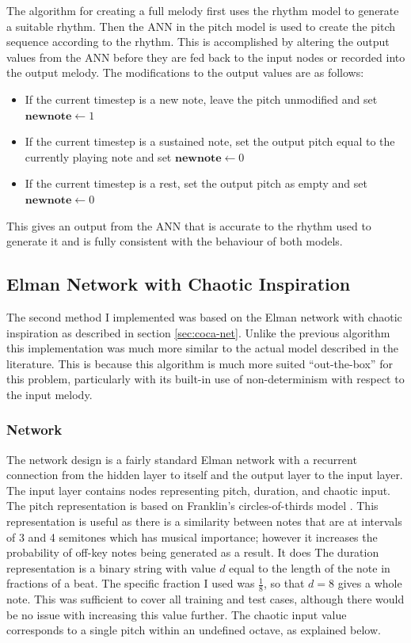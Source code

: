 \documentclass[ author={Stephen Livermore-Tozer},
				supervisor={Dr. Peter Flach},
				degree={MEng},
				title={Algorithmic Co-composition Using Machine Learning},
				subtitle={},
				type={research},
				year={2016} ]{dissertation}
\begin{document}
	The algorithm for creating a full melody first uses the rhythm model to generate a suitable rhythm. Then the ANN in the pitch model is used to create the pitch sequence according to the rhythm. This is accomplished by altering the output values from the ANN before they are fed back to the input nodes or recorded into the output melody. The modifications to the output values are as follows:
	\begin{itemize}
		\item If the current timestep is a new note, leave the pitch unmodified and set $\mathbf{new note} \leftarrow 1$
		\item If the current timestep is a sustained note, set the output pitch equal to the currently playing note and set $\mathbf{new note} \leftarrow 0$
		\item If the current timestep is a rest, set the output pitch as empty and set $\mathbf{new note} \leftarrow 0$
	\end{itemize}
	This gives an output from the ANN that is accurate to the rhythm used to generate it and is fully consistent with the behaviour of both models.
	
	\subsection{Elman Network with Chaotic Inspiration}
	\label{sec:elman-implementation}

	The second method I implemented was based on the Elman network with chaotic inspiration as described in section \ref{sec:coca-net}. Unlike the previous algorithm this implementation was much more similar to the actual model described in the literature. This is because this algorithm is much more suited ``out-the-box'' for this problem, particularly with its built-in use of non-determinism with respect to the input melody. 
	
	\subsubsection{Network}
	
	The network design is a fairly standard Elman network with a recurrent connection from the hidden layer to itself and the output layer to the input layer. The input layer contains nodes representing pitch, duration, and chaotic input. The pitch representation is based on Franklin's circles-of-thirds model \cite{franklin2006recurrent}. This representation is useful as there is a similarity between notes that are at intervals of 3 and 4 semitones which has musical importance; however it increases the probability of off-key notes being generated as a result. It does The duration representation is a binary string with value $d$ equal to the length of the note in fractions of a beat. The specific fraction I used was $\frac{1}{8}$, so that $d = 8$ gives a whole note. This was sufficient to cover all training and test cases, although there would be no issue with increasing this value further. The chaotic input value corresponds to a single pitch within an undefined octave, as explained below.
	
\end{document}
